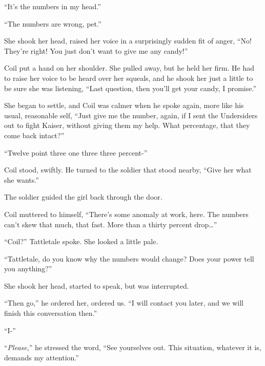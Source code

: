 ``It's the numbers in my head.''



``The numbers are wrong, pet.''



She shook her head, raised her voice in a surprisingly sudden fit of anger, ``No!  They're right!  You just don't want to give me any candy!''



Coil put a hand on her shoulder.  She pulled away, but he held her firm.  He had to raise her voice to be heard over her squeals, and he shook her just a little to be sure she was listening, ``Last question, then you'll get your candy, I promise.''



She began to settle, and Coil was calmer when he spoke again, more like his usual, reasonable self, ``Just give me the number, again, if I sent the Undersiders out to fight Kaiser, without giving them my help.  What percentage, that they come back intact?''



``Twelve point three one three three percent-''



Coil stood, swiftly.  He turned to the soldier that stood nearby, ``Give her what she wants.''



The soldier guided the girl back through the door.



Coil muttered to himself, ``There's some anomaly at work, here.  The numbers can't skew that much, that fast.  More than a thirty percent drop\ldots''



``Coil?'' Tattletale spoke.  She looked a little pale.



``Tattletale, do you know why the numbers would change?  Does your power tell you anything?''



She shook her head, started to speak, but was interrupted.



``Then go,'' he ordered her, ordered us.  ``I will contact you later, and we will finish this conversation then.''



``I-''



``\emph{Please},'' he stressed the word, ``See yourselves out.  This situation, whatever it is, demands my attention.''



